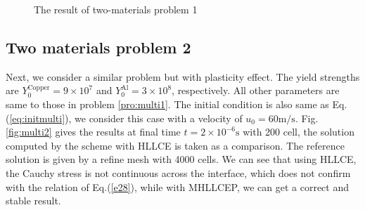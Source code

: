 \documentclass{article}
\numberwithin{equation}{section}
\numberwithin{table}{section}
\begin{document}
\begin{figure}
	  \caption{ The result of two-materials  problem 1}
	  \label{fig:multi1}
	\end{figure}

\subsection{Two materials problem 2}
Next, we consider a similar problem but with plasticity effect. The yield strengths are $Y_0^{\text{Copper}} = 9\times 10^7$ and $Y_0^{\text{Al}} = 3\times 10^8$, respectively. All other  parameters are same to those in problem \ref{pro:multi1}. The initial condition is also same as  Eq.(\ref{eq:initmulti}), we consider this case with a velocity of $u_0 = 60 \text{m}/\text{s}$.
Fig.\ref{fig:multi2} gives the results at final time $ t= 2 \times 10^{-6} \text{s}$ with 200 cell, the solution computed by the scheme with HLLCE is taken as a comparison. The reference solution is given by a refine mesh with 4000 cells. We can see that using HLLCE, the Cauchy stress is not continuous across the interface, which does not confirm with the relation of Eq.(\ref{e28}), while with MHLLCEP, we can get a correct and stable result.
\end{document}
